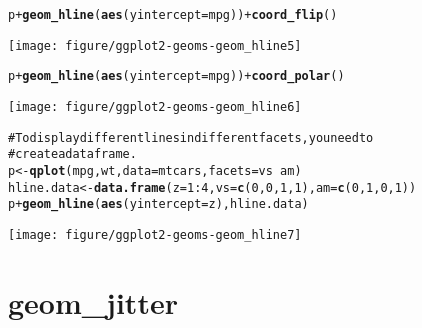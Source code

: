 \documentclass[a4paper,titlepage]{tufte-handout}\usepackage{graphicx, color}
\makeatletter
\def\maxwidth{ %
  \ifdim\Gin@nat@width>\linewidth
    \linewidth
  \else
    \Gin@nat@width
  \fi
}
\newcommand{\hlfunctioncall}[1]{\textcolor[rgb]{0.501960784313725,0,0.329411764705882}{\textbf{#1}}}%
\newcommand{\hlcomment}[1]{\textcolor[rgb]{0.180392156862745,0.6,0.341176470588235}{#1}}%
\newenvironment{kframe}{%
 \def\at@end@of@kframe{}%
 \ifinner\ifhmode%
  \def\at@end@of@kframe{\end{minipage}}%
  \begin{minipage}{\columnwidth}%
 \fi\fi%
 \def\FrameCommand##1{\hskip\@totalleftmargin \hskip-\fboxsep
 \colorbox{shadecolor}{##1}\hskip-\fboxsep
     \hskip-\linewidth \hskip-\@totalleftmargin \hskip\columnwidth}%
 \MakeFramed {\advance\hsize-\width
   \@totalleftmargin\z@ \linewidth\hsize
   \@setminipage}}%
 {\par\unskip\endMakeFramed%
 \at@end@of@kframe}
\newenvironment{knitrout}{}{} %
\makeatother
\begin{document}
\begin{knitrout}
\begin{kframe}
\begin{alltt}
p + \hlfunctioncall{geom_hline}(\hlfunctioncall{aes}(yintercept=mpg)) + \hlfunctioncall{coord_flip}()
\end{alltt}
\end{kframe}\texttt{[image: figure/ggplot2-geoms-geom\_hline5]} \begin{kframe}\begin{alltt}
p + \hlfunctioncall{geom_hline}(\hlfunctioncall{aes}(yintercept=mpg)) + \hlfunctioncall{coord_polar}()
\end{alltt}
\end{kframe}\texttt{[image: figure/ggplot2-geoms-geom\_hline6]} \begin{kframe}\begin{alltt}
\hlcomment{# To display different lines in different facets, you need to}
\hlcomment{# create a data frame.}
p <- \hlfunctioncall{qplot}(mpg, wt, data=mtcars, facets = vs ~ am)
hline.data <- \hlfunctioncall{data.frame}(z = 1:4, vs = \hlfunctioncall{c}(0,0,1,1), am = \hlfunctioncall{c}(0,1,0,1))
p + \hlfunctioncall{geom_hline}(\hlfunctioncall{aes}(yintercept = z), hline.data)
\end{alltt}
\end{kframe}\texttt{[image: figure/ggplot2-geoms-geom\_hline7]} 
\end{knitrout}


\section{geom\_jitter}
\end{document}
